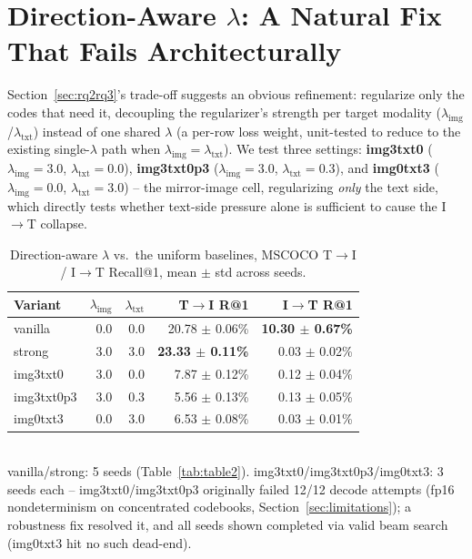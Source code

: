 \section{Direction-Aware $\lambda$: A Natural Fix That Fails Architecturally}
\label{sec:direction-aware}

Section~\ref{sec:rq2rq3}'s trade-off suggests an obvious refinement: regularize only the codes that need it, decoupling the regularizer's strength per target modality ($\lambda_{\text{img}}$/$\lambda_{\text{txt}}$) instead of one shared $\lambda$ (a per-row loss weight, unit-tested to reduce to the existing single-$\lambda$ path when $\lambda_{\text{img}}=\lambda_{\text{txt}}$). We test three settings: \textbf{img3txt0} ($\lambda_{\text{img}}=3.0$, $\lambda_{\text{txt}}=0.0$), \textbf{img3txt0p3} ($\lambda_{\text{img}}=3.0$, $\lambda_{\text{txt}}=0.3$), and \textbf{img0txt3} ($\lambda_{\text{img}}=0.0$, $\lambda_{\text{txt}}=3.0$) -- the mirror-image cell, regularizing \emph{only} the text side, which directly tests whether text-side pressure alone is sufficient to cause the I$\to$T collapse.

\begin{table}[t]
\centering
\caption{Direction-aware $\lambda$ vs.\ the uniform baselines, MSCOCO T$\to$I / I$\to$T Recall@1, mean $\pm$ std across seeds.}
\label{tab:direction-aware}
\footnotesize
\begin{tabular}{@{}lrrrr@{}}
\toprule
Variant & $\lambda_{\text{img}}$ & $\lambda_{\text{txt}}$ & T$\to$I R@1 & I$\to$T R@1 \\
\midrule
vanilla      & 0.0 & 0.0 & 20.78 $\pm$ 0.06\% & \textbf{10.30 $\pm$ 0.67\%} \\
strong       & 3.0 & 3.0 & \textbf{23.33 $\pm$ 0.11\%} & 0.03 $\pm$ 0.02\% \\
img3txt0     & 3.0 & 0.0 & 7.87 $\pm$ 0.12\% & 0.12 $\pm$ 0.04\% \\
img3txt0p3   & 3.0 & 0.3 & 5.56 $\pm$ 0.13\% & 0.13 $\pm$ 0.05\% \\
img0txt3     & 0.0 & 3.0 & 6.53 $\pm$ 0.08\% & 0.03 $\pm$ 0.01\% \\
\bottomrule
\end{tabular}
\\[2pt]
\footnotesize vanilla/strong: 5 seeds (Table~\ref{tab:table2}). img3txt0/img3txt0p3/img0txt3: 3 seeds each -- img3txt0/img3txt0p3 originally failed 12/12 decode attempts (fp16 nondeterminism on concentrated codebooks, Section~\ref{sec:limitations}); a robustness fix resolved it, and all seeds shown completed via valid beam search (img0txt3 hit no such dead-end).
\end{table}

